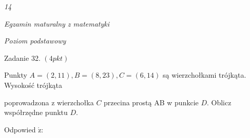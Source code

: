 \documentclass[a4paper,12pt]{article}
\begin{document}
{\it 14}

{\it Egzamin maturalny z matematyki}

{\it Poziom podstawowy}

Zadanie 32. $(4pkt)$

Punkty $A=(2,11), B=(8,23), C=(6,14)$ są wierzchołkami trójkąta. Wysokość trójkąta

poprowadzona z wierzchołka $C$ przecina prostą AB w punkcie $D$. Oblicz współrzędne punktu $D.$

Odpowied $\acute{\mathrm{z}}$:
\end{document}
